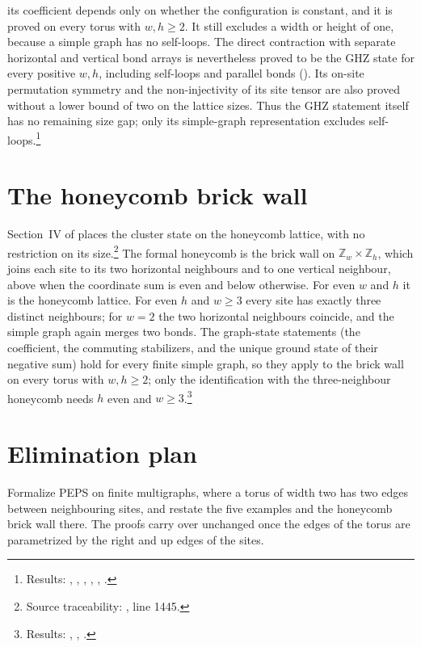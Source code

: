 \documentclass{article}
\begin{document}
its coefficient depends only on whether the configuration is constant,
and it is proved on every torus with $w,h\ge2$. It still excludes a
width or height of one, because a simple graph has no self-loops.
The direct contraction with separate horizontal and vertical bond arrays
is nevertheless proved to be the GHZ state for every positive $w,h$,
including self-loops and parallel bonds
(). Its on-site permutation
symmetry and the non-injectivity of its site tensor are also proved without
a lower bound of two on the lattice sizes. Thus the GHZ statement itself
has no remaining size gap; only its simple-graph representation excludes
self-loops.\footnote{Results: ,
    ,
    ,
    ,
    ,
    .}

\section{The honeycomb brick wall}
Section~IV of \cite{Cirac2021Matrix} places the cluster state on the
honeycomb lattice, with no restriction on its size.\footnote{Source
    traceability: , line 1445.}
The formal honeycomb is the brick wall on $\mathbb Z_w\times\mathbb Z_h$,
which joins each site to its two horizontal neighbours and to one vertical
neighbour, above when the coordinate sum is even and below otherwise. For
even $w$ and $h$ it is the honeycomb lattice. For even $h$ and $w\geq3$
every site has exactly three distinct neighbours; for $w=2$ the two
horizontal neighbours coincide, and the simple graph again merges two
bonds. The graph-state statements (the coefficient, the commuting
stabilizers, and the unique ground state of their negative sum) hold for
every finite simple graph, so they apply to the brick wall on every torus
with $w,h\geq2$; only the identification with the three-neighbour
honeycomb needs $h$ even and $w\geq3$.\footnote{Results:
    ,
    ,
    .}

\section{Elimination plan}
Formalize PEPS on finite multigraphs, where a torus of width two has two
edges between neighbouring sites, and restate the five examples and the
honeycomb brick wall there. The
proofs carry over unchanged once the edges of the torus are parametrized by
the right and up edges of the sites.



\end{document}
